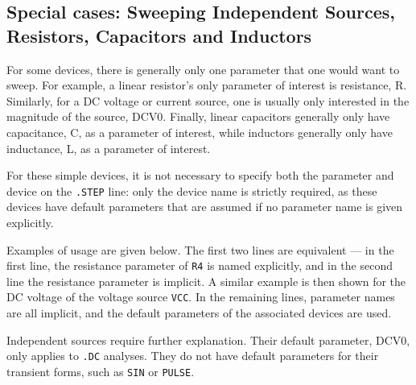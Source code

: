 \subsection{Special cases: Sweeping Independent Sources, Resistors, Capacitors and Inductors}
\label{step_SpecialCases}

For some devices, there is generally only one parameter that one would
want to sweep.  For example, a linear resistor's only parameter of
interest is resistance, R.  Similarly, for a DC voltage or current
source, one is usually only interested in the magnitude of the source,
DCV0.  Finally, linear capacitors generally only have capacitance, C,
as a parameter of interest, while inductors generally only have
inductance, L, as a parameter of interest.

For these simple devices, it is not necessary to specify both the
parameter and device on the \texttt{.STEP} line: only the device name
is strictly required, as these devices have default parameters that
are assumed if no parameter name is given explicitly.

Examples of usage are given below.  The first two lines are equivalent
--- in the first line, the resistance parameter of \texttt{R4} is
named explicitly, and in the second line the resistance parameter is
implicit. A similar example is then shown for the DC voltage of the
voltage source \texttt{VCC}.  In the remaining lines, parameter names
are all implicit, and the default parameters of the associated devices
are used.


Independent sources require further explanation.  Their default
parameter, DCV0, only applies to \texttt{.DC} analyses.  They do not have
default parameters for their transient forms, such as \texttt{SIN}
or \texttt{PULSE}.

